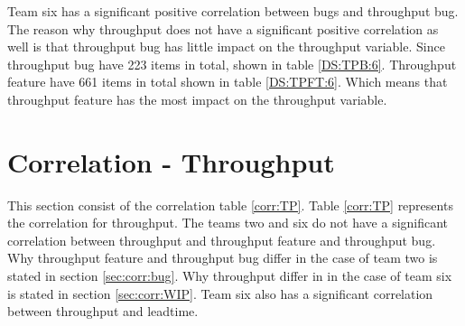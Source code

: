 \documentclass[UKenglish]{ifimaster}  %
\begin{document}
Team six has a significant positive correlation between bugs and throughput bug. The reason why throughput does not have a significant positive correlation as well is that throughput bug has little impact on the throughput variable. Since throughput bug have 223 items in total, shown in table \ref{DS:TPB:6}. Throughput feature have 661 items in total shown in table \ref{DS:TPFT:6}. Which means that throughput feature has the most impact on the throughput variable. 



\section {Correlation - Throughput}
\label{sec:corr:TP}
This section consist of the correlation table \ref{corr:TP}. Table  \ref{corr:TP} represents the correlation for throughput. The teams two and six do not have a significant correlation between throughput and throughput feature and throughput bug. Why throughput feature and throughput bug differ in the case of team two is stated in section \ref{sec:corr:bug}. Why throughput differ in in the case of team six is stated in section \ref{sec:corr:WIP}. Team six also has a significant correlation between throughput and leadtime.
\end{document}
